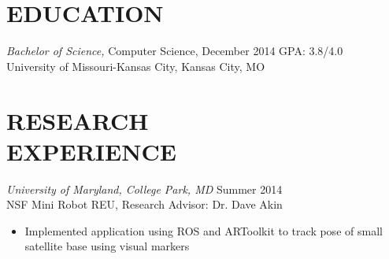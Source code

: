\documentclass[line,margin]{res}
\begin{document}
\address{\hfill victoria.chen.wu@gmail.com  \textbar \textbar \hspace{1 mm} vptarmigan.wordpress.com \textbar \textbar \hspace{1 mm} (913) 235 - 1070 
} 

 
\begin{resume}
 
\section{EDUCATION} {\sl Bachelor of Science,} Computer Science, December 2014 	\hfill GPA: 3.8/4.0\\
                University of Missouri-Kansas City, Kansas City, MO 
\section {RESEARCH \\ EXPERIENCE}
		{\sl University of Maryland, College Park, MD}  \hfill  Summer 2014\\
		NSF Mini Robot REU, Research Advisor: Dr. Dave Akin 
                 \begin{itemize}[leftmargin=5mm]  \itemsep -2pt %
		 \item Implemented application using ROS and ARToolkit to track pose of small satellite base using visual markers
         \end{itemize} 
		

\end{resume}
\end{document}

